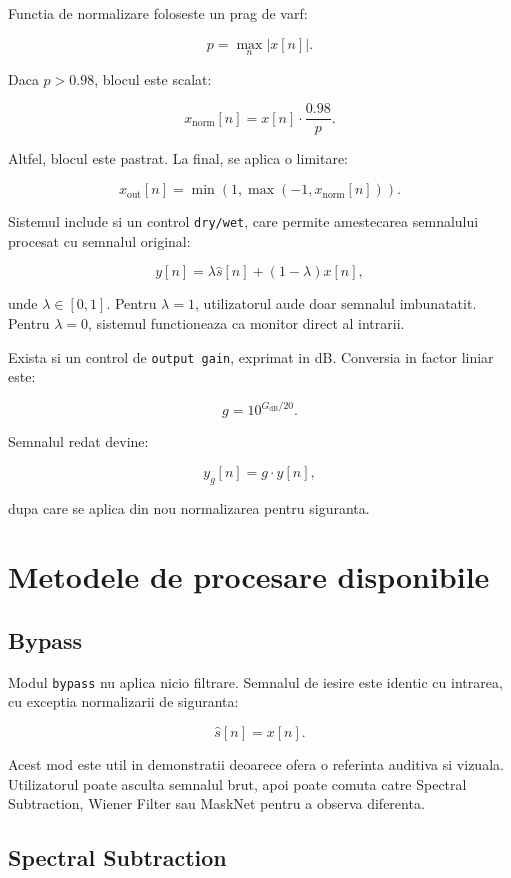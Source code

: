 Functia de normalizare foloseste un prag de varf:

\[
p = \max_n |x[n]|.
\]

Daca \(p > 0.98\), blocul este scalat:

\[
x_{\text{norm}}[n] = x[n] \cdot \frac{0.98}{p}.
\]

Altfel, blocul este pastrat. La final, se aplica o limitare:

\[
x_{\text{out}}[n] = \min(1, \max(-1, x_{\text{norm}}[n])).
\]

Sistemul include si un control \texttt{dry/wet}, care permite amestecarea
semnalului procesat cu semnalul original:

\[
y[n] = \lambda \hat{s}[n] + (1-\lambda)x[n],
\]

unde \(\lambda \in [0,1]\). Pentru \(\lambda = 1\), utilizatorul aude doar
semnalul imbunatatit. Pentru \(\lambda = 0\), sistemul functioneaza ca monitor
direct al intrarii.

Exista si un control de \texttt{output gain}, exprimat in dB. Conversia in
factor liniar este:

\[
g = 10^{G_{\text{dB}}/20}.
\]

Semnalul redat devine:

\[
y_g[n] = g \cdot y[n],
\]

dupa care se aplica din nou normalizarea pentru siguranta.

\section{Metodele de procesare disponibile}

\subsection{Bypass}

Modul \texttt{bypass} nu aplica nicio filtrare. Semnalul de iesire este identic
cu intrarea, cu exceptia normalizarii de siguranta:

\[
\hat{s}[n] = x[n].
\]

Acest mod este util in demonstratii deoarece ofera o referinta auditiva si
vizuala. Utilizatorul poate asculta semnalul brut, apoi poate comuta catre
Spectral Subtraction, Wiener Filter sau MaskNet pentru a observa diferenta.

\subsection{Spectral Subtraction}


